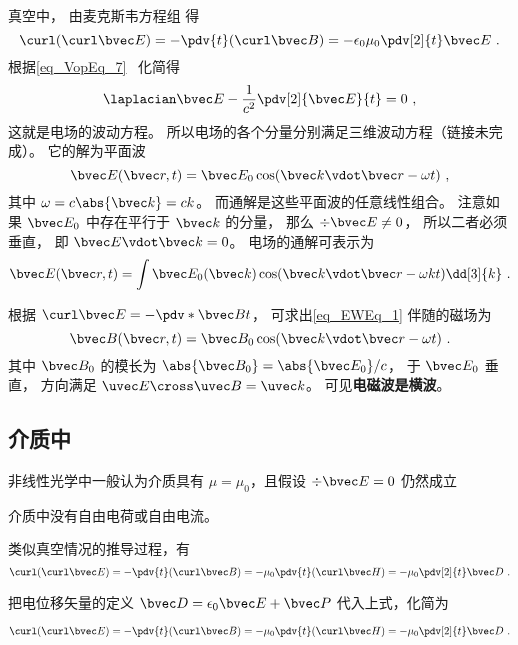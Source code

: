 
\begin{issues}
\issueDraft
{}
\end{issues}


真空中， 由麦克斯韦方程组 得
\begin{equation}
\curl(\curl\bvec E) = -\pdv{t} (\curl\bvec B) = -\epsilon_0\mu_0 \pdv[2]{t} \bvec E~.
\end{equation}
根据\autoref{eq_VopEq_7}~ 化简得
\begin{equation}
\laplacian \bvec E - \frac{1}{c^2} \pdv[2]{\bvec E}{t} = 0~,
\end{equation}
这就是电场的波动方程。 所以电场的各个分量分别满足三维波动方程（链接未完成）。 它的解为平面波
\begin{equation}\label{eq_EWEq_1}
\bvec E(\bvec r, t) = \bvec E_0 \cos(\bvec k\vdot \bvec r - \omega t)~,
\end{equation}
其中 $\omega = c\abs{\bvec k} = ck$。 而通解是这些平面波的任意线性组合。 注意如果 $\bvec E_0$ 中存在平行于 $\bvec k$ 的分量， 那么 $\div \bvec E \ne 0$， 所以二者必须垂直， 即 $\bvec E \vdot \bvec k = 0$。 电场的通解可表示为
\begin{equation}
\bvec E(\bvec r, t) = \int \bvec E_0(\bvec k) \cos(\bvec k\vdot \bvec r - \omega k t) \dd[3]{k}~.
\end{equation}

根据 $\curl \bvec E = -\pdv*{\bvec B}{t}$， 可求出\autoref{eq_EWEq_1} 伴随的磁场为
\begin{equation}
\bvec B(\bvec r, t) = \bvec B_0 \cos(\bvec k \vdot \bvec r - \omega t)~.
\end{equation}
其中 $\bvec B_0$ 的模长为 $\abs{\bvec B_0} = \abs{\bvec E_0}/c$， 于 $\bvec E_0$ 垂直， 方向满足 $\uvec E \cross \uvec B = \uvec k$。 可见\textbf{电磁波是横波}。

\subsection{介质中}

非线性光学中一般认为介质具有 $\mu = \mu_0$，且假设 $\div\bvec E = 0$ 仍然成立

介质中没有自由电荷或自由电流。

类似真空情况的推导过程，有
\begin{equation}
\curl(\curl\bvec E) = -\pdv{t} (\curl\bvec B) = -\mu_0 \pdv{t} (\curl\bvec H)
= -\mu_0 \pdv[2]{t} \bvec D~.
\end{equation}

把电位移矢量的定义 $\bvec D = \epsilon_0\bvec E + \bvec P$ 代入上式，化简为

\begin{equation}
\curl(\curl\bvec E) = -\pdv{t} (\curl\bvec B) = -\mu_0 \pdv{t} (\curl\bvec H)
= -\mu_0 \pdv[2]{t} \bvec D~.
\end{equation}
